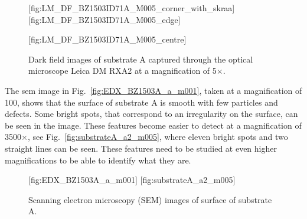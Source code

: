 \begin{figure}[htbp]
    \centering
    [fig:LM_DF_BZ1503ID71A_M005_corner_with_skraa]
    [fig:LM_DF_BZ1503ID71A_M005_edge]
    \par\bigskip
    [fig:LM_DF_BZ1503ID71A_M005_centre]
    \caption[Dark field images of substrate A.]{Dark field images of substrate A captured through the optical microscope Leica DM RXA2 at a magnification of 5$\times$.}
    \label{fig:LM_DF_BZ1503}
\end{figure}

The \ac{sem} image in Fig.~\ref{fig:EDX_BZ1503A_a_m001}, taken at a magnification of 100, shows that the surface of substrate A is smooth with few particles and defects. Some bright spots, that correspond to an irregularity on the surface, can be seen in the image. These features become easier to detect at a magnification of 3500$\times$, see Fig.~\ref{fig:substrateA_a2_m005}, where eleven bright spots and two straight lines can be seen. These features need to be studied at even higher magnifications to be able to identify what they are.
\begin{figure}[htbp]
    \centering
    [fig:EDX_BZ1503A_a_m001]
    [fig:substrateA_a2_m005]
    \caption[SEM images of substrate A.]{Scanning electron microscopy (SEM) images of surface of substrate A.}
    \label{fig:subA_overview}
\end{figure}

